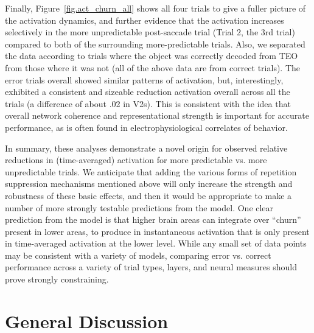 \documentclass[11pt,twoside]{article}
\newif\myifpdf
\begin{document}
Finally, Figure~\ref{fig.act_churn_all} shows all four trials to give a fuller picture of the activation dynamics, and further evidence that the activation increases selectively in the more unpredictable post-saccade trial (Trial 2, the 3rd trial) compared to both of the surrounding more-predictable trials.  Also, we separated the data according to trials where the object was correctly decoded from TEO from those where it was not (all of the above data are from correct trials).  The error trials overall showed similar patterns of activation, but, interestingly, exhibited a consistent and sizeable reduction activation overall across all the trials (a difference of about .02 in V2s).  This is consistent with the idea that overall network coherence and representational strength is important for accurate performance, as is often found in electrophysiological correlates of behavior.


In summary, these analyses demonstrate a novel origin for observed relative reductions in (time-averaged) activation for more predictable vs. more unpredictable trials.  We anticipate that adding the various forms of repetition suppression mechanisms mentioned above will only increase the strength and robustness of these basic effects, and then it would be appropriate to make a number of more strongly testable predictions from the model.  One clear prediction from the model is that higher brain areas can integrate over ``churn'' present in lower areas, to produce in instantaneous activation that is only present in time-averaged activation at the lower level.  While any small set of data points may be consistent with a variety of models, comparing error vs. correct performance across a variety of trial types, layers, and neural measures should prove strongly constraining.

\section{General Discussion}
\end{document}
